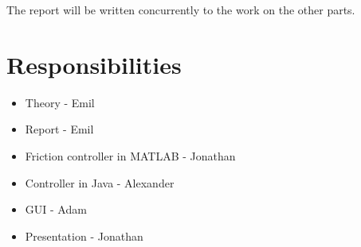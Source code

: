 \documentclass[10pt,a4paper]{article}
\begin{document}
The report will be written concurrently to the work on the other parts.




\section{Responsibilities}
\begin{itemize}
\item Theory - Emil
\item Report - Emil
\item Friction controller in MATLAB - Jonathan
\item Controller in Java - Alexander
\item GUI - Adam
\item Presentation - Jonathan

\end{itemize}
\end{document}
